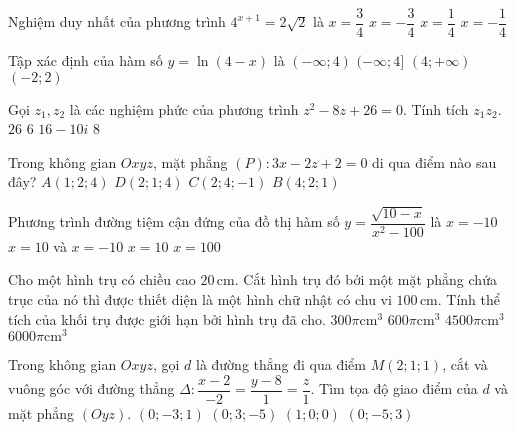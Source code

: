 \begin{ex}%
Nghiệm duy nhất của phương trình $4^{x+1}=2\sqrt{2}$ là
\choice
{$x=\dfrac{3}{4}$}
{$x=-\dfrac{3}{4}$}
{$x=\dfrac{1}{4}$}
{\True $x=-\dfrac{1}{4}$}

\end{ex}
\begin{ex}%
Tập xác định của hàm số $y=\ln (4-x)$ là
\choice
{\True $(-\infty; 4)$}
{$(-\infty; 4]$}
{$(4;+\infty)$}
{$(-2; 2)$}

\end{ex}
\begin{ex}%
Gọi $z_1, z_2$ là các nghiệm phức của phương trình $z^2-8 z+26=0$. Tính tích $z_1 z_2$.
\choice
{\True $26$}
{$6$}
{$16-10 i$}
{$8$}

\end{ex}
\begin{ex}%
Trong không gian $O x y z$, mặt phẳng $(P)\colon 3 x-2 z+2=0$ di qua điểm nào sau đây?
\choice
{$A(1; 2; 4)$}
{\True $D(2; 1; 4)$}
{$C(2; 4;-1)$}
{$B(4; 2; 1)$}

\end{ex}
\begin{ex}%
Phương trình đường tiệm cận đứng của đồ thị hàm số $y=\dfrac{\sqrt{10-x}}{x^2-100}$ là
\choice
{$x=-10$}
{\True $x=10$ và $x=-10$}
{$x=10$}
{$x=100$}

\end{ex}
\begin{ex}%
Cho một hình trụ có chiều cao $20\mathrm{\,cm}$. Cắt hình trụ đó bởi một mặt phẳng chứa trục của nó thì được thiết diện là một hình chữ nhật có chu vi $100\mathrm{\,cm}$. Tính thể tích của khối trụ được giới hạn bởi hình trụ đã cho.
\choice
{$300\pi \mathrm{cm}^3$}
{$600\pi \mathrm{cm}^3$}
{\True $4500\pi \mathrm{cm}^3$}
{$6000\pi \mathrm{cm}^3$}

\end{ex}
\begin{ex}%
Trong không gian $O x y z$, gọi $d$ là đường thẳng đi qua điểm $M(2; 1; 1)$, cắt và vuông góc với đường thẳng $\Delta\colon \dfrac{x-2}{-2}=\dfrac{y-8}{1}=\dfrac{z}{1}$. Tìm tọa độ giao điểm của $d$ và mặt phẳng $(O y z)$.
\choice
{$(0;-3; 1)$}
{$(0; 3;-5)$}
{$(1; 0; 0)$}
{\True $(0;-5; 3)$}

\end{ex}

